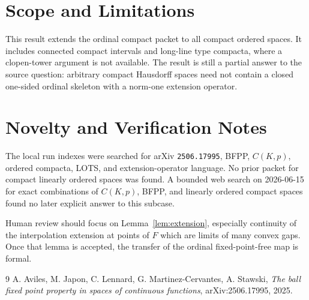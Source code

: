 \documentclass[11pt]{article}
\begin{document}
\section*{Scope and Limitations}

This result extends the ordinal compact packet to all compact ordered spaces.
It includes connected compact intervals and long-line type compacta, where a
clopen-tower argument is not available.  The result is still a partial answer
to the source question: arbitrary compact Hausdorff spaces need not contain a
closed one-sided ordinal skeleton with a norm-one extension operator.

\section*{Novelty and Verification Notes}

The local run indexes were searched for arXiv \texttt{2506.17995}, BFPP,
\(C(K,p)\), ordered compacta, LOTS, and extension-operator language.  No prior
packet for compact linearly ordered spaces was found.  A bounded web search on
2026-06-15 for exact combinations of \(C(K,p)\), BFPP, and linearly ordered
compact spaces found no later explicit answer to this subcase.

Human review should focus on Lemma~\ref{lem:extension}, especially continuity
of the interpolation extension at points of \(F\) which are limits of many
convex gaps.  Once that lemma is accepted, the transfer of the ordinal
fixed-point-free map is formal.

\begin{thebibliography}{9}
A. Aviles, M. Japon, C. Lennard, G. Martinez-Cervantes, A. Stawski,
\emph{The ball fixed point property in spaces of continuous functions},
arXiv:2506.17995, 2025.
\end{thebibliography}
\end{document}
